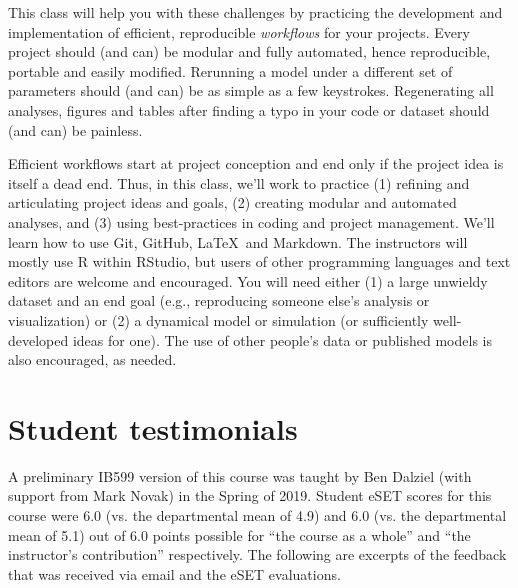 \documentclass[10pt]{article}
\begin{document}
This class will help you with these challenges by practicing the development and implementation of efficient, reproducible \emph{workflows} for your projects.  Every project should (and can) be modular and fully automated, hence reproducible, portable and easily modified.  Rerunning a model under a different set of parameters should (and can) be as simple as a few keystrokes. Regenerating all analyses, figures and tables after finding a typo in your code or dataset should (and can) be painless.

Efficient workflows start at project conception and end only if the project idea is itself a dead end.  Thus, in this class, we'll work to practice (1) refining and articulating project ideas and goals, (2) creating modular and automated analyses, and (3) using best-practices in coding and project management. We'll learn how to use Git, GitHub, \LaTeX\, and Markdown.  The instructors will mostly use \textsf{R} within RStudio, but users of other programming languages and text editors are welcome and encouraged.  You will need either (1) a large unwieldy dataset and an end goal (e.g., reproducing someone else's analysis or visualization) or (2) a dynamical model or simulation (or sufficiently well-developed ideas for one).  The use of other people's data or published models is also encouraged, as needed.

\section*{Student testimonials}
A preliminary IB599 version of this course was taught by Ben Dalziel (with support from Mark Novak) in the Spring of 2019.  Student eSET scores for this course were 6.0 (vs. the departmental mean of 4.9) and 6.0 (vs. the departmental mean of 5.1) out of 6.0 points possible for ``the course as a whole'' and ``the instructor's contribution'' respectively. The following are excerpts of the feedback that was received via email and the eSET evaluations.
\end{document}
